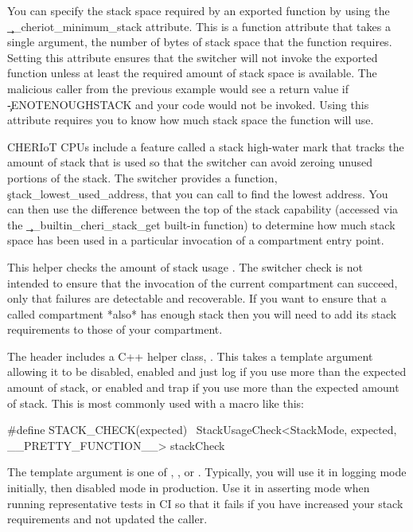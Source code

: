 You can specify the stack space required by an exported function by using the \c{__cheriot_minimum_stack} attribute.
This is a function attribute that takes a single argument, the number of bytes of stack space that the function requires.
Setting this attribute ensures that the switcher will not invoke the exported function unless at least the required amount of stack space is available.
The malicious caller from the previous example would see a return value if \c{-ENOTENOUGHSTACK} and your code would not be invoked.
Using this attribute requires you to know how much stack space the function will use.

CHERIoT CPUs include a feature called a stack high-water mark that tracks the amount of stack that is used so that the switcher can avoid zeroing unused portions of the stack.
The switcher provides a function, \c{stack_lowest_used_address}, that you can call to find the lowest address.
You can then use the difference between the top of the stack capability (accessed via the \c{__builtin_cheri_stack_get} built-in function) to determine how much stack space has been used in a particular invocation of a compartment entry point.


\begin{note}
This helper checks the amount of stack usage .
The switcher check is not intended to ensure that the invocation of the current compartment can succeed, only that failures are detectable and recoverable.
If you want to ensure that a called compartment *also* has enough stack then you will need to add its stack requirements to those of your compartment.
\end{note}

The  header includes a C++ helper class, .
This takes a template argument allowing it to be disabled, enabled and just log if you use more than the expected amount of stack, or enabled and trap if you use more than the expected amount of stack.
This is most commonly used with a macro like this:

\begin{cxxsnippet}
#define STACK_CHECK(expected) \ 
       StackUsageCheck<StackMode, expected, __PRETTY_FUNCTION__> stackCheck
\end{cxxsnippet}

The  template argument is one of , , or .
Typically, you will use it in logging mode initially, then disabled mode in production.
Use it in asserting mode when running representative tests in CI so that it fails if you have increased your stack requirements and not updated the caller.

